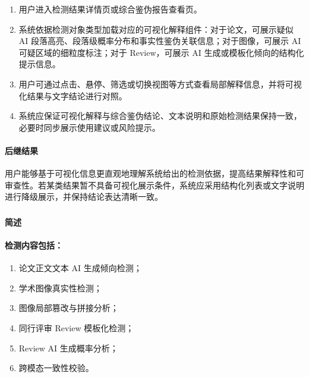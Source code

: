 \begin{enumerate}
    \item 用户进入检测结果详情页或综合鉴伪报告查看页。
    \item 系统依据检测对象类型加载对应的可视化解释组件：对于论文，可展示疑似 AI 段落高亮、段落级概率分布和事实性鉴伪关联信息；对于图像，可展示 AI 可疑区域的细粒度标注；对于 Review，可展示 AI 生成或模板化倾向的结构化提示信息。
    \item 用户可通过点击、悬停、筛选或切换视图等方式查看局部解释信息，并将可视化结果与文字结论进行对照。
    \item 系统应保证可视化解释与综合鉴伪结论、文本说明和原始检测结果保持一致，必要时同步展示使用建议或风险提示。
\end{enumerate}

\paragraph*{后继结果}

用户能够基于可视化信息更直观地理解系统给出的检测依据，提高结果解释性和可审查性。若某类结果暂不具备可视化展示条件，系统应采用结构化列表或文字说明进行降级展示，并保持结论表达清晰一致。

\subsubsection{}

\paragraph*{简述}


\paragraph*{检测内容包括：}

\begin{enumerate}
    \item 论文正文文本 AI 生成倾向检测；
    \item 学术图像真实性检测；
    \item 图像局部篡改与拼接分析；
    \item 同行评审 Review 模板化检测；
    \item Review AI 生成概率分析；
    \item 跨模态一致性校验。
\end{enumerate}

